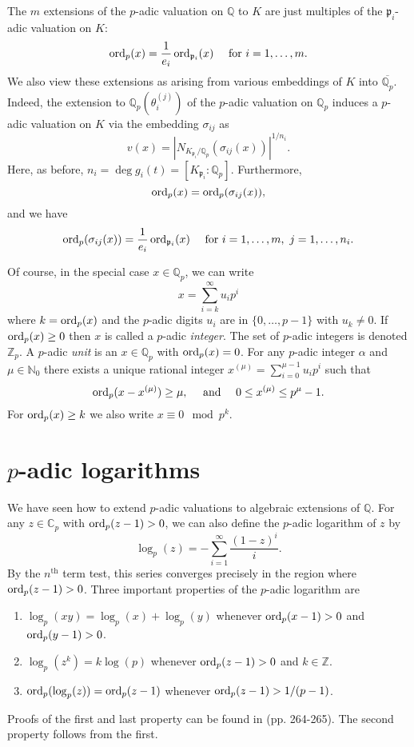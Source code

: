 The $m$ extensions of the $p$-adic valuation on $\mathbb{Q}$ to $K$ are just multiples of the $\mathfrak{p}_i$-adic valuation on $K$:
\[\operatorname{ord}_p(x) = \frac{1}{e_i}\operatorname{ord}_{\mathfrak{p}_i}(x) \quad \text{ for } i = 1, \dots, m.\]
We also view these extensions as arising from various embeddings of $K$ into $\overline{\mathbb{Q}_p}$. Indeed, the extension to $\mathbb{Q}_p(\theta_i^{(j)})$ of the $p$-adic valuation on $\mathbb{Q}_p$ induces a $p$-adic valuation on $K$ via the embedding $\sigma_{ij}$ as 
\[v(x) = |N_{K_{\mathfrak{p}_i}/\mathbb{Q}_p}(\sigma_{ij}(x))|^{1/n_i}.\]
Here, as before, $n_i = \deg g_i(t) = [K_{\mathfrak{p}_i} : \mathbb{Q}_p]$. Furthermore, 
\[\operatorname{ord}_p(x) = \operatorname{ord}_p(\sigma_{ij}(x)),\]
and we have
\[\operatorname{ord}_p(\sigma_{ij}(x)) =  \frac{1}{e_i}\operatorname{ord}_{\mathfrak{p}_i}(x) \quad \text{ for } i = 1, \dots, m,\ j = 1, \dots, n_i.\]

Of course, in the special case $x \in \mathbb{Q}_p$, we can write
\[x = \sum_{i=k}^{\infty} u_ip^i\]
where $k = \operatorname{ord}_p(x)$ and the $p$-adic digits $u_i$ are in $\{0, \dots, p-1\}$ with $u_k \neq 0$. If $\operatorname{ord}_p(x) \geq 0$ then $x$ is called a $p$-adic \textit{integer}. The set of $p$-adic integers is denoted $\mathbb{Z}_p$. A $p$-adic \textit{unit} is an $x \in \mathbb{Q}_p$ with $\operatorname{ord}_p(x) = 0$. For any $p$-adic integer $\alpha$ and $\mu \in \mathbb{N}_0$ there exists a unique rational integer $x^{(\mu)} = \sum_{i=0}^{\mu-1}u_ip^i$ such that 
\[\operatorname{ord}_p(x-x^{(\mu)}) \geq \mu, \quad \text{ and } \quad 0 \leq x^{(\mu)} \leq p^{\mu} - 1.\]
For $\operatorname{ord}_p(x) \geq k$ we also write $x \equiv 0 \mod{p^k}$.


\section{$p$-adic logarithms}
\label{sec:pAdicLogarithms}

We have seen how to extend $p$-adic valuations to algebraic extensions of $\mathbb{Q}$. For any $z \in \mathbb{C}_p$ with $\operatorname{ord}_p(z-1) > 0$, we can also define the $p$-adic logarithm of $z$ by
\[\log_p(z) = -\sum_{i=1}^{\infty} \frac{(1-z)^i}{i}.\]
By the $n^{\text{th}}$ term test, this series converges precisely in the region where ${\operatorname{ord}_p(z-1) > 0}$. Three important properties of the $p$-adic logarithm are
\begin{enumerate}
\item $\log_p(xy) = \log_p(x) + \log_p(y)$ whenever $\operatorname{ord}_p(x-1) > 0$ and $\operatorname{ord}_p(y-1) > 0$.
\item $\log_p(z^k) = k \log(p)$ whenever $\operatorname{ord}_p(z-1) > 0$ and $k \in \mathbb{Z}$. 
\item $\operatorname{ord}_p(\log_p(z)) = \operatorname{ord}_p(z-1)$ whenever $\operatorname{ord}_p(z-1) > 1/(p-1)$.
\end{enumerate}
Proofs of the first and last property can be found in \cite{Has2} (pp. 264-265). The second property follows from the first.

